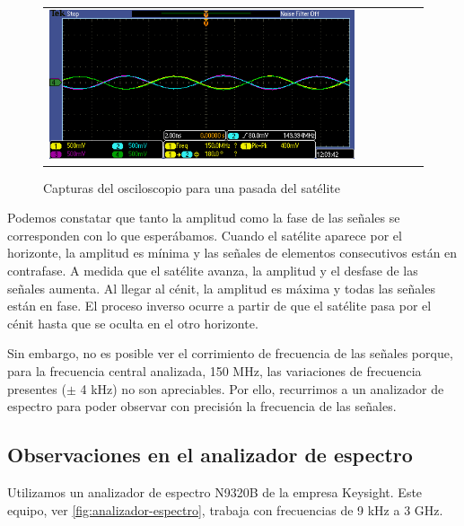 \documentclass{article}
\newenvironment{standalone}{\begin{preview}}{\end{preview}}
\begin{document}
\begin{standalone}
\begin{figure}[!htbp]
\begin{tabular}{lccccc}
      \includegraphics[width=\linewidth/3]{../images/pasada-osciloscopio/pasada9.png}\\
    \end{tabular}

    \caption{Capturas del osciloscopio para una pasada del satélite}
    \label{fig:pasada-osciloscopio}
  \end{figure}

  Podemos constatar que tanto la amplitud como la fase de las señales se corresponden con lo que esperábamos.
  Cuando el satélite aparece por el horizonte, la amplitud es mínima y las señales de elementos consecutivos están en contrafase.
  A medida que el satélite avanza, la amplitud y el desfase de las señales aumenta.
  Al llegar al cénit, la amplitud es máxima y todas las señales están en fase.
  El proceso inverso ocurre a partir de que el satélite pasa por el cénit hasta que se oculta en el otro horizonte.

  Sin embargo, no es posible ver el corrimiento de frecuencia de las señales porque, para la frecuencia central analizada, 150 MHz, las variaciones de frecuencia presentes ($\pm$ 4 kHz) no son apreciables.
  Por ello, recurrimos a un analizador de espectro para poder observar con precisión la frecuencia de las señales.

  \subsection{Observaciones en el analizador de espectro}

  Utilizamos un analizador de espectro N9320B de la empresa Keysight.
  Este equipo, ver \cref{fig:analizador-espectro}, trabaja con frecuencias de 9 kHz a 3 GHz.


\end{standalone}
\end{document}
